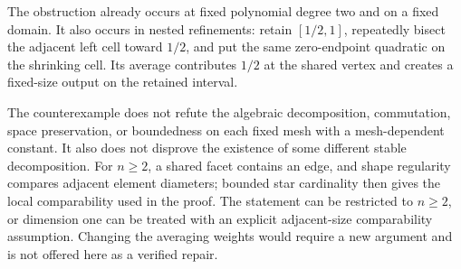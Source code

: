 \documentclass[10pt]{article}
\begin{document}
The obstruction already occurs at fixed polynomial degree two and on a fixed domain. It also occurs in nested refinements: retain \([1/2,1]\), repeatedly bisect the adjacent left cell toward \(1/2\), and put the same zero-endpoint quadratic on the shrinking cell. Its average contributes \(1/2\) at the shared vertex and creates a fixed-size output on the retained interval.\par
The counterexample does not refute the algebraic decomposition, commutation, space preservation, or boundedness on each fixed mesh with a mesh-dependent constant. It also does not disprove the existence of some different stable decomposition. For \(n\ge2\), a shared facet contains an edge, and shape regularity compares adjacent element diameters; bounded star cardinality then gives the local comparability used in the proof. The statement can be restricted to \(n\ge2\), or dimension one can be treated with an explicit adjacent-size comparability assumption. Changing the averaging weights would require a new argument and is not offered here as a verified repair.\par
\end{document}
